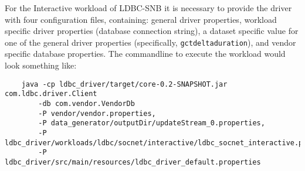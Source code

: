 For the Interactive workload of LDBC-SNB it is necessary to provide the driver with four configuration files, containing:
general driver properties,
workload specific driver properties (\eg database connection string),
a dataset specific value for one of the general driver properties (specifically, \texttt{gctdeltaduration}),
and vendor specific database properties.
The commandline to execute the workload would look something like:

{\footnotesize
	\begin{verbatim}
	java -cp ldbc_driver/target/core-0.2-SNAPSHOT.jar com.ldbc.driver.Client
		-db com.vendor.VendorDb
		-P vendor/vendor.properties,
		-P data_generator/outputDir/updateStream_0.properties,
		-P ldbc_driver/workloads/ldbc/socnet/interactive/ldbc_socnet_interactive.properties
		-P ldbc_driver/src/main/resources/ldbc_driver_default.properties
	\end{verbatim}
}
